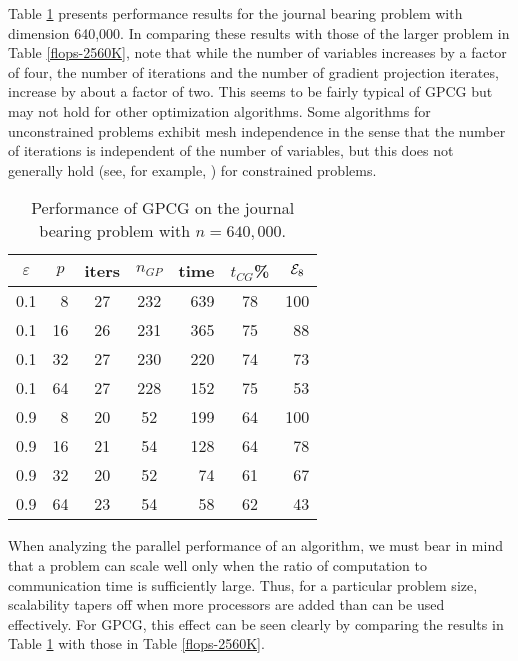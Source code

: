 \documentclass{esub2acm}
\begin{document}
Table \ref{flops-640K} presents performance results for the journal
bearing problem with dimension 640,000.
In comparing these results with those of the larger problem in Table
\ref{flops-2560K}, note that while the number of variables increases
by a factor of four,
the number of iterations and the number of gradient projection iterates,
increase by about a factor of two.
This seems to be fairly typical of GPCG but may not hold for
other optimization algorithms.
Some algorithms for unconstrained problems exhibit mesh independence in the
sense that the number of iterations is independent of the number of
variables, but this does not generally hold 
(see, for example, ) for constrained problems.


\begin{table}[htbp]
\caption{Performance of GPCG on the journal bearing problem
with $ n = 640,000 $.}
\label{flops-640K}
\medskip
\begin{center}
\footnotesize
\begin{tabular}{| c r | c c r c r |}
\hline
\multicolumn{1}{|c}{$ \varepsilon $} & 
\multicolumn{1}{c|}{$ p $} & 
\multicolumn{1}{c}{iters} &
\multicolumn{1}{c}{$n_{GP}$} & 
\multicolumn{1}{c}{time} &
\multicolumn{1}{c}{$t_{CG}$\%} & 
\multicolumn{1}{c|}{$ {\cal E}_8 $} \\ \hline
0.1  & 8 & 27 & 232 & 639 & 78 & 100 \\
0.1  & 16 & 26 & 231 & 365 & 75 & 88 \\ 
0.1  & 32 & 27 & 230 & 220 & 74 & 73 \\
0.1  & 64 & 27 & 228 & 152 & 75 & 53 \\
\hline
0.9  & 8 & 20 & 52 & 199 & 64 & 100 \\
0.9  & 16 & 21 & 54 & 128 & 64 & 78 \\
0.9  & 32 & 20 & 52 & 74 & 61 & 67 \\
0.9  & 64 & 23 & 54 & 58 & 62 & 43 \\
\hline

\end{tabular}
\end{center}
\end{table}

When analyzing the parallel performance of an algorithm, we must bear
in mind that a problem can scale well only when the ratio of
computation to communication time is sufficiently large.  Thus, for a
particular problem size, scalability tapers off when more processors
are added than can be used effectively.  For GPCG, this effect can be
seen clearly by comparing the results in Table \ref{flops-640K} with
those in Table \ref{flops-2560K}.
\end{document}

